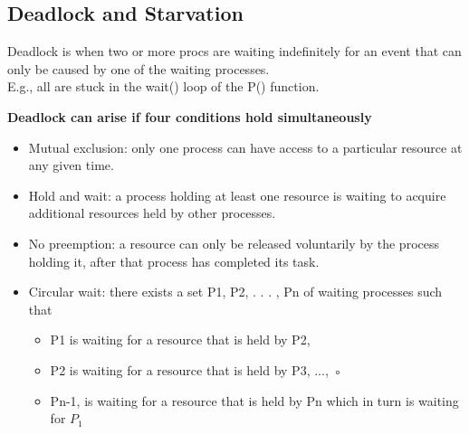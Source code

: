 \documentclass[a4paper, 10pt]{article}
\begin{document}
\subsection{Deadlock and Starvation}
\begin{definitionbox}{}{}
    Deadlock is when two or more procs are waiting indefinitely for an event that can only be caused by one of the waiting processes. \\[2ex]

    E.g., all are stuck in the wait() loop of the P() function.
\end{definitionbox}
\textbf{Deadlock can arise if four conditions hold simultaneously}
\begin{itemize}
    \item Mutual exclusion: only one process can have access to a particular resource at any given time.
    \item Hold and wait: a process holding at least one resource is waiting to acquire additional resources held by other processes.
    \item  No preemption: a resource can only be released voluntarily by the process holding it, after that process has completed its task.
    \item Circular wait: there exists a set {P1, P2, . . . , Pn} of waiting processes such that
          \begin{itemize}
              \item P1 is waiting for a resource that is held by P2,
              \item P2 is waiting for a resource that is held by P3, ..., ◦
              \item Pn-1, is waiting for a resource that is held by Pn which in turn is waiting for $P_1$
          \end{itemize}
\end{itemize}
\end{document}
